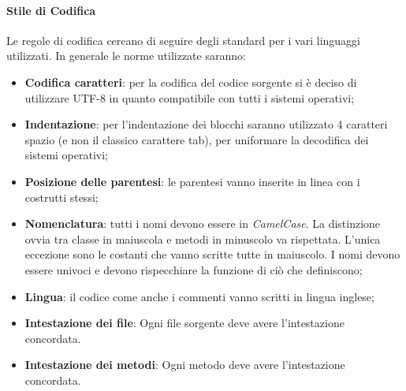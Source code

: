 \paragraph{Stile di Codifica}
Le regole di codifica cercano di seguire degli standard per i vari linguaggi utilizzati. In generale le norme utilizzate saranno:
\begin{itemize}
  \item \textbf{Codifica caratteri}: per la codifica del codice sorgente si è deciso di utilizzare UTF-8 in quanto compatibile con tutti i sistemi operativi;
  \item \textbf{Indentazione}: per l'indentazione dei blocchi saranno utilizzato 4 caratteri spazio (e non il classico carattere tab), per uniformare la decodifica dei sistemi operativi;
  \item \textbf{Posizione delle parentesi}: le parentesi vanno inserite in linea con i costrutti stessi;
  \item \textbf{Nomenclatura}: tutti i nomi devono essere in \textit{CamelCase\glo}. La distinzione ovvia tra classe in maiuscola e metodi in minuscolo va rispettata. L'unica eccezione sono le costanti che vanno scritte tutte in maiuscolo. I nomi devono essere univoci e devono rispecchiare la funzione di ciò che definiscono;
  \item \textbf{Lingua}: il codice come anche i commenti vanno scritti in lingua inglese;
  \item \textbf{Intestazione dei file}: Ogni file sorgente deve avere l'intestazione concordata.
  \item \textbf{Intestazione dei metodi}: Ogni metodo deve avere l'intestazione concordata.
\end{itemize}
